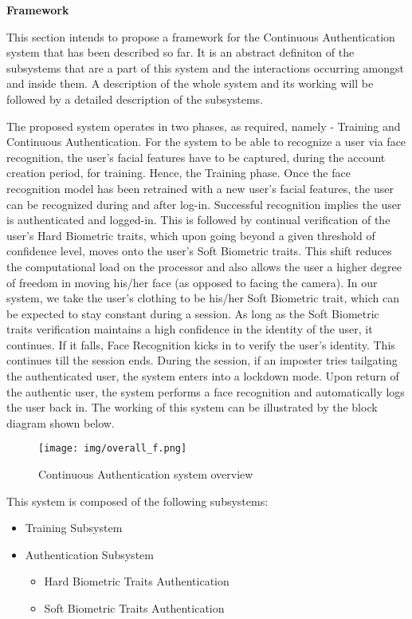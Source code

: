 \documentclass[12pt]{article}			%
\begin{document}

\begin{center}
	{\LARGE \bf Framework}
\end{center}
This section intends to propose a framework for the Continuous Authentication system that has been described so far. It is an abstract definiton of the subsystems that are a part of this system and the interactions occurring amongst and inside them. A description of the whole system and its working will be followed by a detailed description of the subsystems.

The proposed system operates in two phases, as required, namely - Training and Continuous Authentication. For the system to be able to recognize a user via face recognition, the user's facial features have to be captured, during the account creation period, for training. Hence, the Training phase. Once the face recognition model has been retrained with a new user's facial features, the user can be recognized during and after log-in. Successful recognition implies the user is authenticated and logged-in. This is followed by continual verification of the user's Hard Biometric traits, which upon going beyond a given threshold of confidence level, moves onto the user's Soft Biometric traits. This shift reduces the computational load on the processor and also allows the user a higher degree of freedom in moving his/her face (as opposed to facing the camera). In our system, we take the user's clothing to be his/her Soft Biometric trait, which can be expected to stay constant during a session. As long as the Soft Biometric traits verification maintains a high confidence in the identity of the user, it continues. If it falls, Face Recognition kicks in to verify the user's identity. This continues till the session ends. During the session, if an imposter tries tailgating the authenticated user, the system enters into a lockdown mode. Upon return of the authentic user, the system performs a face recognition and automatically logs the user back in. The working of this system can be illustrated by the block diagram shown below. 

\begin{figure}[h!]
        \centering
        \texttt{[image: img/overall\_f.png]}
        \caption{Continuous Authentication system overview}
        \label{fig:ca_overview}
\end{figure}

This system is composed of the following subsystems:
\begin{itemize}
\item Training Subsystem
\item Authentication Subsystem
	\begin{itemize}
	\item Hard Biometric Traits Authentication
	\item Soft Biometric Traits Authentication
	\end{itemize} 
\end{itemize} 
\end{document}
